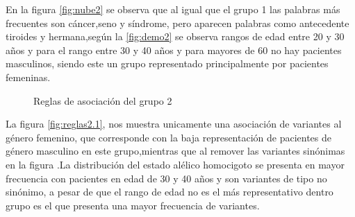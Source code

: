 En la figura \ref{fig:nube2} se observa que al igual que el grupo 1 las palabras más frecuentes son cáncer,seno y síndrome, pero aparecen palabras como antecedente tiroides y hermana,según la \ref{fig:demo2} se observa rangos de edad entre 20 y 30 años y para el rango entre 30 y 40 años y para mayores de 60 no hay pacientes masculinos, siendo este un grupo representado principalmente por pacientes femeninas.  

\begin{figure}[H]
	\centering
	\caption{Reglas de asociación del grupo 2}\label{fig:reglas2}
\end{figure}

La figura \ref{fig:reglas2.1}, nos muestra unicamente una asociación de variantes al género femenino, que corresponde con la baja representación de pacientes de género  masculino en este grupo,mientras que al remover las variantes sinónimas en la figura \label{fig:reglas2.2} .La distribución del estado alélico homocigoto se presenta en mayor frecuencia con pacientes en edad de 30 y 40 años y son variantes de tipo no sinónimo, a pesar de que el rango de edad no es el más representativo dentro grupo es el que presenta una mayor frecuencia de variantes.
 


